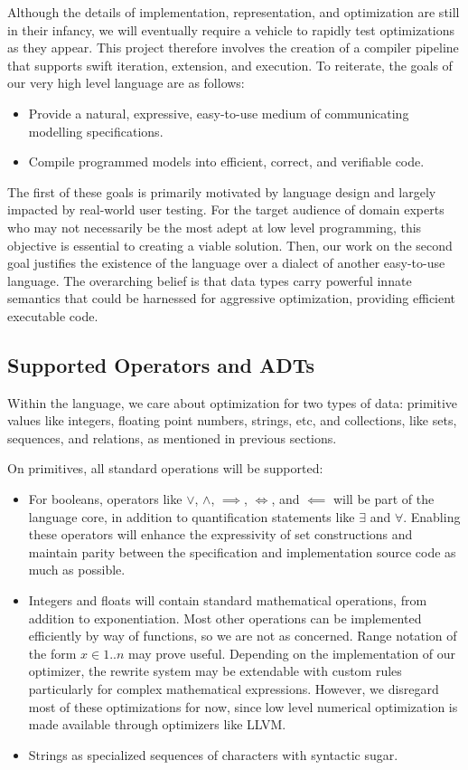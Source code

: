 \documentclass{article}
\begin{document}
Although the details of implementation, representation, and optimization are still in their infancy, we will eventually require a vehicle to rapidly test optimizations as they appear. This project therefore involves the creation of a compiler pipeline that supports swift iteration, extension, and execution. To reiterate, the goals of our very high level language are as follows:
\begin{itemize}
  \item Provide a natural, expressive, easy-to-use medium of communicating modelling specifications.
  \item Compile programmed models into efficient, correct, and verifiable code.
\end{itemize}
The first of these goals is primarily motivated by language design and largely impacted by real-world user testing. For the target audience of domain experts who may not necessarily be the most adept at low level programming, this objective is essential to creating a viable solution. Then, our work on the second goal justifies the existence of the language over a dialect of another easy-to-use language. The overarching belief is that data types carry powerful innate semantics that could be harnessed for aggressive optimization, providing efficient executable code.

\subsection{Supported Operators and ADTs}
Within the language, we care about optimization for two types of data: primitive values like integers, floating point numbers, strings, etc, and collections, like sets, sequences, and relations, as mentioned in previous sections.

On primitives, all standard operations will be supported:
\begin{itemize}
  \item For booleans, operators like $\lor$, $\land$, $\implies$, $\iff$, and $\impliedby$ will be part of the language core, in addition to quantification statements like $\exists$ and $\forall$. Enabling these operators will enhance the expressivity of set constructions and maintain parity between the specification and implementation source code as much as possible.
  \item Integers and floats will contain standard mathematical operations, from addition to exponentiation. Most other operations can be implemented efficiently by way of functions, so we are not as concerned. Range notation of the form $x \in 1..n$ may prove useful. Depending on the implementation of our optimizer, the rewrite system may be extendable with custom rules particularly for complex mathematical expressions. However, we disregard most of these optimizations for now, since low level numerical optimization is made available through optimizers like LLVM.
  \item Strings as specialized sequences of characters with syntactic sugar.
\end{itemize}
\end{document}
